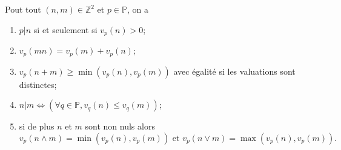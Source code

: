 \documentclass[../main.tex]{subfiles}
\begin{document}
\begin{tcolorbox}[title=Propostion 12.56, title filled=false, colframe=lightblue, colback=lightblue!10!white]
    Pout tout $(n, m) \in \mathbb{Z}^2$ et $p \in \mathbb{P}$, on a
    \begin{enumerate}
        \item $p|n$ si et seulement si $v_p(n) > 0$;
        \item $v_p(mn) = v_p(m) + v_p(n)$;
        \item $v_p(n + m) \geq \min(v_p(n), v_p(m))$ avec égalité si les valuations sont distinctes;
        \item $n|m \Leftrightarrow (\forall q \in \mathbb{P}, v_q(n) \leq v_q(m))$;
        \item si de plus $n$ et $m$ sont non nuls alors
        $$v_p(n \wedge m) = \min(v_p(n), v_p(m)) \text{ et } v_p(n \vee m) = \max(v_p(n), v_p(m)).$$
    \end{enumerate}
\end{tcolorbox}
\end{document}
